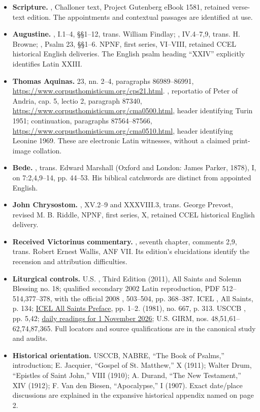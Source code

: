 \begin{itemize}[leftmargin=1.3em,itemsep=.3em]
\item \textbf{Scripture.} , Challoner text, Project Gutenberg eBook 1581, retained verse-text edition. The appointments and contextual passages are identified at use.
\item \textbf{Augustine.} , I.1--4, §§1--12, trans. William Findlay; , IV.4--7,9, trans. H. Browne; , Psalm 23, §§1--6. NPNF, first series, VI--VIII, retained CCEL historical English deliveries. The English psalm heading ``XXIV'' explicitly identifies Latin XXIII.
\item \textbf{Thomas Aquinas.}  23, nn. 2--4, paragraphs 86989--86991, \url{https://www.corpusthomisticum.org/cps21.html}. , reportatio of Peter of Andria, cap. 5, lectio 2, paragraph 87340, \url{https://www.corpusthomisticum.org/cma0500.html}, header identifying Turin 1951; continuation, paragraphs 87564--87566, \url{https://www.corpusthomisticum.org/cma0510.html}, header identifying Leonine 1969. These are electronic Latin witnesses, without a claimed print-image collation.
\item \textbf{Bede.} , trans. Edward Marshall (Oxford and London: James Parker, 1878), I, on 7:2,4,9--14, pp. 44--53. His biblical catchwords are distinct from appointed English.
\item \textbf{John Chrysostom.} , XV.2--9 and XXXVIII.3, trans. George Prevost, revised M. B. Riddle, NPNF, first series, X, retained CCEL historical English delivery.
\item \textbf{Received Victorinus commentary.} , seventh chapter, comments 2,9, trans. Robert Ernest Wallis, ANF VII. Its edition's elucidations identify the recension and attribution difficulties.
\item \textbf{Liturgical controls.} U.S. , Third Edition (2011), All Saints and Solemn Blessing no. 18; qualified secondary 2002 Latin reproduction, PDF 512--514,377--378, with the official 2008 ,  503--504, pp. 368--387. ICEL , All Saints, p. 134; \href{https://www.icelweb.org/musicfolder/73JerusalemD.pdf}{ICEL All Saints Preface}, pp. 1--2.  (1981), no. 667, p. 313. USCCB , pp. 5,42; \href{https://bible.usccb.org/bible/readings/110126.cfm}{daily readings for 1 November 2026}; U.S. GIRM, nos. 48,51,61--62,74,87,365. Full locators and source qualifications are in the canonical study and audits.
\item \textbf{Historical orientation.} USCCB, NABRE, ``The Book of Psalms,'' introduction; E. Jacquier, ``Gospel of St. Matthew,''  X (1911); Walter Drum, ``Epistles of Saint John,'' VIII (1910); A. Durand, ``The New Testament,'' XIV (1912); F. Van den Biesen, ``Apocalypse,'' I (1907). Exact date/place discussions are explained in the expansive historical appendix named on page 2.
\end{itemize}
